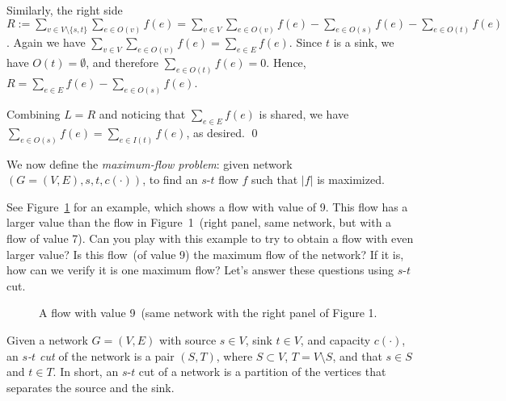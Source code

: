 Similarly, the right side 
$R := \sum_{v\in V\setminus\{s,t\}} \sum_{e\in O(v)} f(e) 
= \sum_{v\in V} \sum_{e\in O(v)} f(e) -  \sum_{e\in O(s)} f(e) - \sum_{e\in O(t)} f(e)$.
Again we have $\sum_{v\in V} \sum_{e\in O(v)} f(e) = \sum_{e\in E} f(e)$.
Since $t$ is a sink, we have $O(t) = \emptyset$, and therefore $\sum_{e\in O(t)} f(e)  = 0$.
Hence, $R = \sum_{e\in E} f(e) - \sum_{e\in O(s)} f(e)$.

Combining $L = R$ and noticing that $\sum_{e\in E} f(e)$ is shared, we have $\sum_{e\in O(s)} f(e) = \sum_{e\in I(t)} f(e)$, as desired.  \qed

We now define the \emph{maximum-flow problem}: given network $(G= (V, E), s, t, c(\cdot))$,
to find an $s$-$t$ flow $f$ such that $|f|$ is maximized.

See Figure~\ref{fig:maxflow} for an example, which shows a flow with value 
of 9. This flow has a larger value than the flow in Figure~1~(right panel,
same network, but with a flow of value 7).
Can you play with this example to try to obtain a flow with even larger value?
Is this flow~(of value 9) the maximum flow of the network?
If it is, how can we verify it is one maximum flow?
Let's answer these questions using $s$-$t$ cut.


\begin{figure}[h]
\centering{}
\caption{A flow with value 9~(same network with the right panel of Figure 1.}
\label{fig:maxflow}
\end{figure}



Given a network $G=(V, E)$ with source $s\in V$, sink $t\in V$, and capacity $c(\cdot)$,
an \emph{$s$-$t$ cut} of the network is a pair $(S, T)$, where $S\subset V$, $T = V\setminus S$,
and that $s\in S$ and $t\in T$. In short, an $s$-$t$ cut of a network is a partition
of the vertices that separates the source and the sink.

